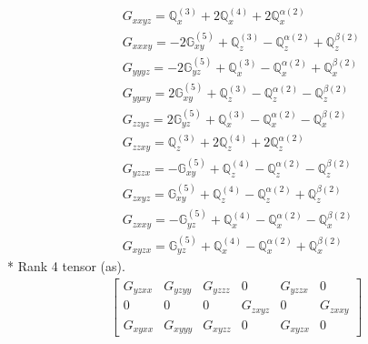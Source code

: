 \documentclass[fleqn,8pt,landscape]{jsarticle}
\begin{document}
\begin{align*}
& G_{xxyz} = \mathbb{Q}_{x}^{(3)} + 2 \mathbb{Q}_{x}^{(4)} + 2 \mathbb{Q}_{x}^{\alpha(2)} \\
& G_{xxxy} = - 2 \mathbb{G}_{xy}^{(5)} + \mathbb{Q}_{z}^{(3)} - \mathbb{Q}_{z}^{\alpha(2)} + \mathbb{Q}_{z}^{\beta(2)} \\
& G_{yyyz} = - 2 \mathbb{G}_{yz}^{(5)} + \mathbb{Q}_{x}^{(3)} - \mathbb{Q}_{x}^{\alpha(2)} + \mathbb{Q}_{x}^{\beta(2)} \\
& G_{yyxy} = 2 \mathbb{G}_{xy}^{(5)} + \mathbb{Q}_{z}^{(3)} - \mathbb{Q}_{z}^{\alpha(2)} - \mathbb{Q}_{z}^{\beta(2)} \\
& G_{zzyz} = 2 \mathbb{G}_{yz}^{(5)} + \mathbb{Q}_{x}^{(3)} - \mathbb{Q}_{x}^{\alpha(2)} - \mathbb{Q}_{x}^{\beta(2)} \\
& G_{zzxy} = \mathbb{Q}_{z}^{(3)} + 2 \mathbb{Q}_{z}^{(4)} + 2 \mathbb{Q}_{z}^{\alpha(2)} \\
& G_{yzzx} = - \mathbb{G}_{xy}^{(5)} + \mathbb{Q}_{z}^{(4)} - \mathbb{Q}_{z}^{\alpha(2)} - \mathbb{Q}_{z}^{\beta(2)} \\
& G_{zxyz} = \mathbb{G}_{xy}^{(5)} + \mathbb{Q}_{z}^{(4)} - \mathbb{Q}_{z}^{\alpha(2)} + \mathbb{Q}_{z}^{\beta(2)} \\
& G_{zxxy} = - \mathbb{G}_{yz}^{(5)} + \mathbb{Q}_{x}^{(4)} - \mathbb{Q}_{x}^{\alpha(2)} - \mathbb{Q}_{x}^{\beta(2)} \\
& G_{xyzx} = \mathbb{G}_{yz}^{(5)} + \mathbb{Q}_{x}^{(4)} - \mathbb{Q}_{x}^{\alpha(2)} + \mathbb{Q}_{x}^{\beta(2)}
\end{align*}
* Rank 4 tensor (as).
\begin{align*}
\begin{bmatrix} G_{yzxx} & G_{yzyy} & G_{yzzz} & 0 & G_{yzzx} & 0 \\ 0 & 0 & 0 & G_{zxyz} & 0 & G_{zxxy} \\ G_{xyxx} & G_{xyyy} & G_{xyzz} & 0 & G_{xyzx} & 0 \end{bmatrix}
\end{align*}
\end{document}
